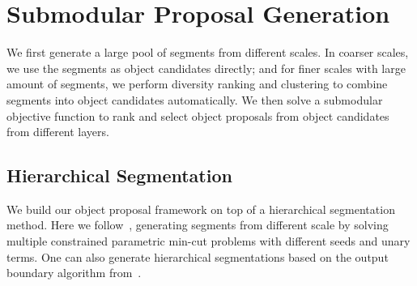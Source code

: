 \documentclass[10pt,twocolumn,letterpaper]{article}
\newcommand{\rk}[1]{{\color{blue}{#1}}}
\begin{document}



\section{Submodular Proposal Generation}
We first generate a large pool of segments from different scales. In coarser scales, we use the segments as object candidates directly; and for finer scales with large amount of segments, we perform diversity ranking and clustering to combine segments into object candidates automatically. We then solve a submodular objective function to rank and select object proposals from object candidates from different layers.  

\subsection{Hierarchical Segmentation}
We build our object proposal framework on top of a hierarchical segmentation method. Here we follow~\cite{Carreira12, Humayun14}, generating segments from different scale by solving multiple constrained parametric min-cut problems with different seeds and unary terms. One can also generate hierarchical segmentations based on the output boundary algorithm from~\cite{Hoiem11,Endres14}.
\end{document}
